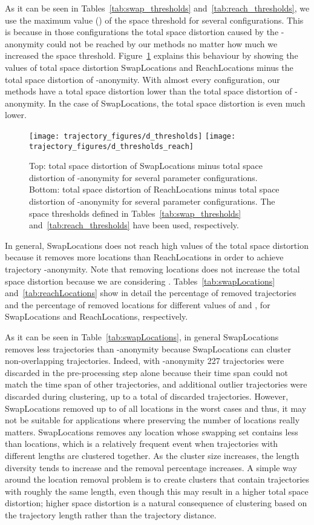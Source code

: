 As it can be seen in Tables~\ref{tab:swap_thresholds}
and~\ref{tab:reach_thresholds}, we use the maximum value () of
the space threshold for several configurations. This is because in those
configurations
the total space distortion caused by the -anonymity
could not be reached by our methods no matter how much we increased
the space threshold.
Figure~\ref{fig:trashed} explains this behaviour by showing
the values of total space distortion SwapLocations
and ReachLocations minus the total space distortion of -anonymity.
With almost every configuration, our methods have a total space
distortion lower than the total space distortion of
-anonymity. In the case of SwapLocations,
the total space distortion is even much lower.

\begin{figure}[!ht]
\centering
\texttt{[image: trajectory\_figures/d\_thresholds]}
\texttt{[image: trajectory\_figures/d\_thresholds\_reach]}
\caption{Top: total space distortion of SwapLocations minus
total space distortion of -anonymity
for several parameter configurations.
Bottom: total space distortion of ReachLocations minus
total space distortion of -anonymity
for several parameter configurations.
The space thresholds defined in Tables~\ref{tab:swap_thresholds}
  and~\ref{tab:reach_thresholds} have been used, respectively.}
\label{fig:trashed}
\end{figure}

In general, SwapLocations does not reach high values of the
total space distortion because it removes more locations than
ReachLocations in order to achieve trajectory -anonymity. Note that
removing locations does not increase the total space distortion
because we are considering . Tables~\ref{tab:swapLocations}
and~\ref{tab:reachLocations} show in detail the percentage of removed
trajectories and the percentage of removed locations for different
values of  and
, for SwapLocations and
ReachLocations, respectively.

As it can be seen in Table~\ref{tab:swapLocations}, in general SwapLocations
removes less trajectories than -anonymity because
SwapLocations can cluster non-overlapping trajectories. Indeed, with
-anonymity 227 trajectories were discarded
in the pre-processing step alone
because their time span could not match the time
span of other trajectories, and additional outlier trajectories
were discarded during clustering, up to a total  of discarded
trajectories. However, SwapLocations removed up to  of all
locations in the worst cases
and thus, it may not be suitable for applications where
preserving the number of locations really matters. SwapLocations
removes any location whose swapping set  contains less than
 locations, which is a relatively frequent event when
 trajectories with
different lengths are clustered together.
As the cluster size  increases, the length diversity tends
to increase and the removal percentage increases.
A simple way around the location removal problem is to
create clusters that contain trajectories with roughly the same length,
even though this may result in a higher total space distortion;
higher space distortion is a natural consequence of clustering
based on the trajectory length rather than the trajectory distance.


